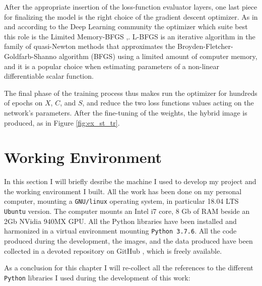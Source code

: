     After the appropriate insertion of the loss-function evaluator layers, one last piece for finalizing the model is the right choice of the gradient descent optimizer. As in \cite{1508.06576} and according to the Deep Learning community the optimizer which suite best this role is the Limited Memory-BFGS \cite{10.1093/imamat/6.1.76},\cite{shanno1970conditioning}. L-BFGS is an iterative algorithm in the family of quasi-Newton methods that approximates the Broyden-Fletcher-Goldfarb-Shanno algorithm (BFGS) using a limited amount of computer memory, and it is a popular choice when estimating parameters of a non-linear differentiable scalar function.

    The final phase of the training process thus makes run the optimizer for hundreds of epochs on $X$, $C$, and $S$, and reduce the two loss functions values acting on the network's parameters. After the fine-tuning of the weights, the hybrid image is produced, as in Figure \ref{fig:ex_st_tr}.

\section{Working Environment} \label{ssec:my_machine}
In this section I will briefly desribe the machine I used to develop my project and the working environment I built.
All the work has been done on my personal computer, mounting a \texttt{GNU/linux} operating system, in particular 18.04 LTS \texttt{Ubuntu} version. The computer mounts an Intel i7 core, 8 Gb of RAM beside an 2Gb NVidia 940MX GPU.
All the Python libraries have been installed and harmonized in a virtual environment mounting \texttt{Python 3.7.6}.
All the code produced during the development, the images, and the data produced have been collected in a devoted repository on GitHub \cite{repo}, which is freely available.

As a conclusion for this chapter I will re-collect all the references to the different \texttt{Python} libraries I used during the development of this work:

